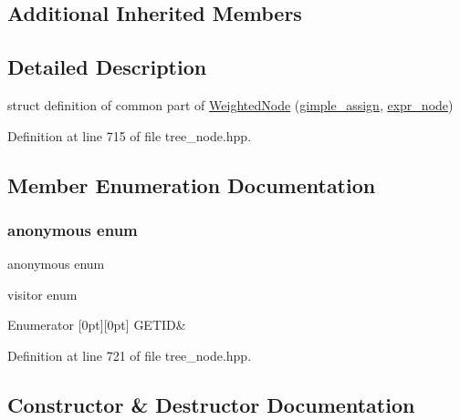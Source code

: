 \subsection*{Additional Inherited Members}


\subsection{Detailed Description}
struct definition of common part of \hyperlink{structWeightedNode}{Weighted\+Node} (\hyperlink{structgimple__assign}{gimple\+\_\+assign}, \hyperlink{structexpr__node}{expr\+\_\+node}) 

Definition at line 715 of file tree\+\_\+node.\+hpp.



\subsection{Member Enumeration Documentation}
\mbox{\label{structWeightedNode_a226ac12f5796ef63d4cf6ba0b5971c76}} 
\subsubsection{\texorpdfstring{anonymous enum}{anonymous enum}}
{\footnotesize\ttfamily anonymous enum}



visitor enum 

\begin{DoxyEnumFields}{Enumerator}
[0pt][0pt]{}\mbox{\label{structWeightedNode_a226ac12f5796ef63d4cf6ba0b5971c76a02aa9554a26c861862e4487c51543758}} 
G\+E\+T\+ID&\\
\hline

\end{DoxyEnumFields}


Definition at line 721 of file tree\+\_\+node.\+hpp.



\subsection{Constructor \& Destructor Documentation}
\mbox{\label{structWeightedNode_a7eeeb644e4bb4ce880c0ef4c35eda2c5}} 
